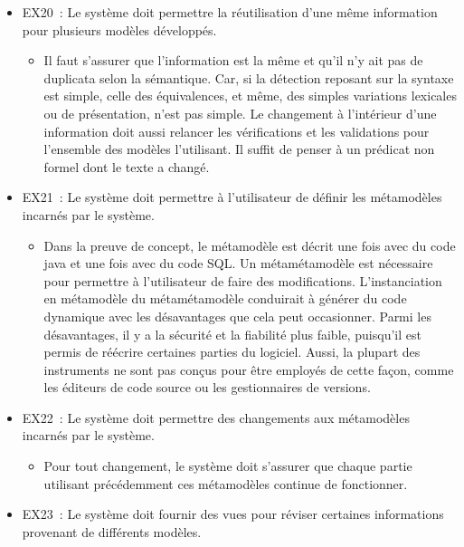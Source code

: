 {\begin{itemize}
\begin{itemize}
        \item Chaque information n'ayant pas de provenance (source) devrait faire l'objet d'une attention particulière.
    \end{itemize}
    \item EX20~: Le système doit permettre la réutilisation d'une même information pour plusieurs modèles développés. 
    \begin{itemize}
        \item Il faut s'assurer que l'information est la même et qu'il n'y ait pas de duplicata selon la sémantique. Car, si la détection reposant sur la syntaxe est simple, celle des équivalences, et même, des simples variations lexicales ou de présentation, n’est pas simple. Le changement à l'intérieur d'une information doit aussi relancer les vérifications et les validations pour l'ensemble des modèles l'utilisant. Il suffit de penser à un prédicat non formel dont le texte a changé.
    \end{itemize}
    \item EX21~: Le système doit permettre à l'utilisateur de définir les métamodèles incarnés par le système.
    \begin{itemize}
        \item Dans la preuve de concept, le métamodèle est décrit une fois avec du code java et une fois avec du code SQL. Un métamétamodèle est nécessaire pour permettre à l'utilisateur de faire des modifications. L'instanciation en métamodèle du métamétamodèle conduirait à générer du code dynamique avec les désavantages que cela peut occasionner. Parmi les désavantages, il y a la sécurité et la fiabilité plus faible, puisqu'il est permis de réécrire certaines parties du logiciel. Aussi, la plupart des instruments ne sont pas conçus pour être employés de cette façon, comme les éditeurs de code source ou les gestionnaires de versions.
    \end{itemize}
    \item EX22~: Le système doit permettre des changements aux métamodèles incarnés par le système.
    \begin{itemize}
        \item Pour tout changement, le système doit s'assurer que chaque partie utilisant précédemment ces métamodèles continue de fonctionner.
    \end{itemize}
    \item EX23~: Le système doit fournir des vues pour réviser certaines informations provenant de différents modèles. 
    \begin{itemize}

\end{itemize}
\end{itemize}}
